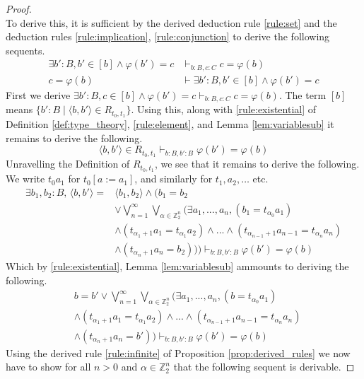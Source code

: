 \documentclass{birkjour}
\theoremstyle{plain}
\theoremstyle{definition}
\newcommand{\bb}[1]{\mathbb{#1}}
\begin{document}
\begin{proof}
\begin{equation}
		\end{equation}
		To derive this, it is sufficient by the derived deduction rule \eqref{rule:set} and the deduction rules \eqref{rule:implication}, \eqref{rule:conjunction} to derive the following sequents.
		\begin{align}
			\exists b':B, b' \in [b] \wedge \varphi(b') = c&\vdash_{b : B, c:C} c = \varphi(b)\\
			c = \varphi(b) &\vdash \exists b':B, b' \in [b] \wedge \varphi(b') = c
		\end{align}
		First we derive $\exists b':B, c \in [b] \wedge \varphi(b') = c\vdash_{b : B, c:C} c = \varphi(b)$. The term $[b]$ means $\lbrace b' :B \mid \langle b,b'\rangle \in R_{t_0,t_1}\rbrace$. Using this, along with \eqref{rule:existential} of Definition \ref{def:type_theory}, \eqref{rule:element}, and Lemma \ref{lem:variablesub} it remains to derive the following.
		\begin{equation}
			\langle b,b'\rangle \in R_{t_0,t_1} \vdash_{b:B,b':B} \varphi(b') = \varphi(b)
		\end{equation}
		Unravelling the Definition of $R_{t_0,t_1}$, we see that it remains to derive the following. We write $t_0a_1$ for $t_0[a := a_1]$, and similarly for $t_1, a_2,\ldots$ etc.
		\begin{align*}
			\exists b_1, b_2 : B\text{, }\langle b,b'\rangle = &\langle b_1, b_2 \rangle \wedge \Big(b_1 = b_2\\
			&\vee \bigvee_{n = 1}^\infty\bigvee_{\alpha \in \bb{Z}_2^n}\big( \exists a_1,...,a_n, (b_1 = t_{\alpha_0}a_1)\\
			&\wedge (t_{\alpha_1 + 1}a_1 = t_{\alpha_1}a_2) \wedge ... \wedge (t_{\alpha_{n-1}+1}a_{n-1} = t_{\alpha_{n}}a_{n})\\
			&\wedge (t_{\alpha_{n}+1}a_{n} = b_2)\big)\Big) \vdash_{b:B,b':B} \varphi(b') = \varphi(b)
		\end{align*}
		Which by \eqref{rule:existential}, Lemma \ref{lem:variablesub} ammounts to deriving the following.
		\begin{align*}
			&b = b' \vee \bigvee_{n = 1}^\infty\bigvee_{\alpha \in \bb{Z}_2^n}\big( \exists a_1,...,a_n, (b = t_{\alpha_0}a_1)\\
			&\wedge (t_{\alpha_1 + 1}a_1 = t_{\alpha_1}a_2) \wedge ... \wedge (t_{\alpha_{n-1}+1}a_{n-1} = t_{\alpha_{n}}a_{n})\\
			&\wedge (t_{\alpha_{n}+1}a_{n} = b')\big) \vdash_{b:B,b':B} \varphi(b') = \varphi(b)
		\end{align*}
		Using the derived rule \eqref{rule:infinite} of Proposition \ref{prop:derived_rules} we now have to show for all $n >0$ and $\alpha \in \bb{Z}_2^n$ that the following sequent is derivable.

\end{proof}
\end{document}
